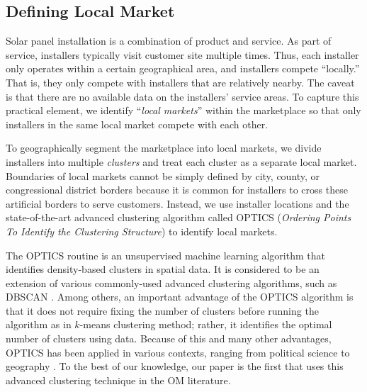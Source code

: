\documentclass[msom,blindrev]{informs3}
\begin{document}
	
	\subsection{Defining Local Market}
	\label{defining_local_market}
	
	
	Solar panel installation is a combination of product and service. As part of service, installers typically visit customer site multiple times. Thus, each installer only operates  within a certain geographical area, and installers compete ``locally.'' That is, they only compete with installers that are relatively nearby. The caveat is that there are no available data on the installers' service areas. To capture this practical element, we identify ``\emph{local markets}'' within the marketplace so that only installers in the same local market compete with each other.
	
	To geographically segment the marketplace into local markets, we divide installers into multiple \emph{clusters} and treat each cluster as a separate local market. Boundaries of local markets cannot be simply defined by city, county, or congressional district borders because it is common for installers to cross these artificial borders to serve customers. Instead, we use installer locations and the state-of-the-art advanced clustering algorithm called OPTICS (\textit{Ordering Points To Identify the Clustering Structure}) to identify local markets.
	
	The OPTICS routine is an unsupervised machine learning algorithm that identifies density-based clusters in spatial data. It is considered to be an extension of various commonly-used advanced clustering algorithms, such as DBSCAN \citep{kanagala2016comparative}. Among others, an important advantage of the OPTICS algorithm is that it does not require fixing the number of clusters before running the algorithm as in $k$-means clustering method; rather, it identifies the optimal number of clusters using data. Because of this and many other advantages, OPTICS has been applied in various contexts, ranging from political science \citep{davidson2019neighborhood} to geography \citep{teimouri2016method}. To the best of our knowledge, our paper is the first that uses this advanced clustering technique in the OM literature.
	
	
\end{document}
